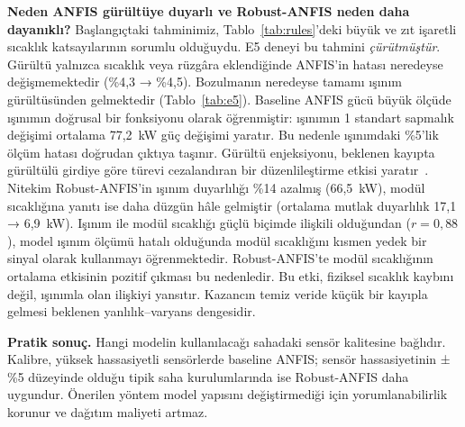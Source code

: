 \documentclass[11pt,a4paper]{article}
\begin{document}
\textbf{Neden ANFIS gürültüye duyarlı ve Robust-ANFIS neden daha dayanıklı?} Başlangıçtaki tahminimiz, Tablo~\ref{tab:rules}'deki büyük ve zıt işaretli sıcaklık katsayılarının sorumlu olduğuydu. E5 deneyi bu tahmini \emph{çürütmüştür}. Gürültü yalnızca sıcaklık veya rüzgâra eklendiğinde ANFIS'in hatası neredeyse değişmemektedir (\%4,3 → \%4,5). Bozulmanın neredeyse tamamı ışınım gürültüsünden gelmektedir (Tablo~\ref{tab:e5}). Baseline ANFIS gücü büyük ölçüde ışınımın doğrusal bir fonksiyonu olarak öğrenmiştir: ışınımın 1 standart sapmalık değişimi ortalama 77,2~kW güç değişimi yaratır. Bu nedenle ışınımdaki \%5'lik ölçüm hatası doğrudan çıktıya taşınır. Gürültü enjeksiyonu, beklenen kayıpta gürültülü girdiye göre türevi cezalandıran bir düzenlileştirme etkisi yaratır~\cite{bishop1995}. Nitekim Robust-ANFIS'in ışınım duyarlılığı \%14 azalmış (66,5~kW), modül sıcaklığına yanıtı ise daha düzgün hâle gelmiştir (ortalama mutlak duyarlılık 17,1 → 6,9~kW). Işınım ile modül sıcaklığı güçlü biçimde ilişkili olduğundan ($r=0{,}88$), model ışınım ölçümü hatalı olduğunda modül sıcaklığını kısmen yedek bir sinyal olarak kullanmayı öğrenmektedir. Robust-ANFIS'te modül sıcaklığının ortalama etkisinin pozitif çıkması bu nedenledir. Bu etki, fiziksel sıcaklık kaybını değil, ışınımla olan ilişkiyi yansıtır. Kazancın temiz veride küçük bir kayıpla gelmesi beklenen yanlılık–varyans dengesidir.

\textbf{Pratik sonuç.} Hangi modelin kullanılacağı sahadaki sensör kalitesine bağlıdır. Kalibre, yüksek hassasiyetli sensörlerde baseline ANFIS; sensör hassasiyetinin ±\%5 düzeyinde olduğu tipik saha kurulumlarında ise Robust-ANFIS daha uygundur. Önerilen yöntem model yapısını değiştirmediği için yorumlanabilirlik korunur ve dağıtım maliyeti artmaz.

\end{document}
